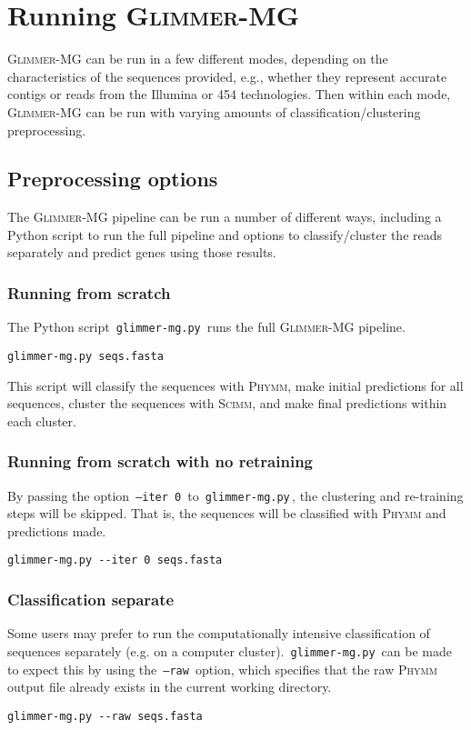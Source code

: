 \documentclass[fleqn,titlepage,11pt]{article}
\def\Gmg{\textsc{Glimmer-MG}}
\def\Phymm{\textsc{Phymm}}
\def\Scimm{\textsc{Scimm}}
\def\Pg#1{\texttt{#1}}
\begin{document}
\section{Running \Gmg{}}
\Gmg{} can be run in a few different modes, depending on the
characteristics of the sequences provided, e.g., whether they
represent accurate contigs or reads from the Illumina or 454
technologies. Then within each mode, \Gmg{} can be run with varying
amounts of classification/clustering preprocessing.

\subsection{Preprocessing options}
The \Gmg{} pipeline can be run a number of different ways, including a
Python script to run the full pipeline and options to classify/cluster
the reads separately and predict genes using those results.

\subsubsection{Running from scratch}
The Python script \,\Pg{glimmer-mg.py}\, runs the full \Gmg{}
pipeline.
\BSV
\begin{verbatim}
glimmer-mg.py seqs.fasta
\end{verbatim}
\ESV
This script will classify the sequences with \Phymm{}, make initial
predictions for all sequences, cluster the sequences with \Scimm{},
and make final predictions within each cluster.

\subsubsection{Running from scratch with no retraining}
By passing the option \,\Pg{--iter 0}\, to \,\Pg{glimmer-mg.py}\,, the
clustering and re-training steps will be skipped. That is, the
sequences will be classified with \Phymm{} and predictions made.
\BSV
\begin{verbatim}
glimmer-mg.py --iter 0 seqs.fasta
\end{verbatim}
\ESV

\subsubsection{Classification separate}
Some users may prefer to run the computationally intensive
classification of sequences separately (e.g. on a computer cluster).
\,\Pg{glimmer-mg.py}\, can be made to expect this by using the
\,\Pg{--raw}\, option, which specifies that the raw \Phymm{} output file
already exists in the current working directory.
\BSV
\begin{verbatim}
glimmer-mg.py --raw seqs.fasta
\end{verbatim}
\ESV
\end{document}
